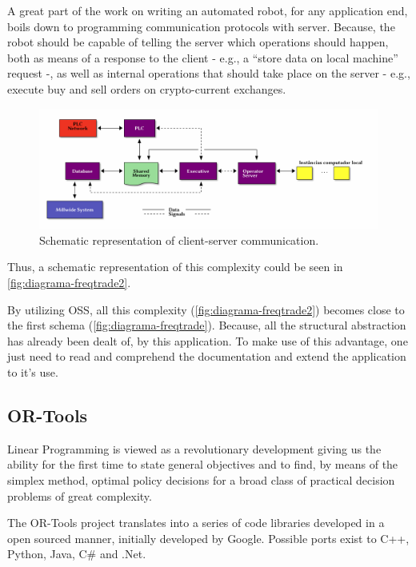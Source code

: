 \documentclass[
12pt,				%
openright,			%
oneside,			%
a4paper,			%
brazil,				%
english,			  %
]{abntex2}
\begin{document}
A great part of the work on writing an automated robot, for any
application end, boils down to programming communication protocols
with server. Because, the robot should be capable of telling the
server which operations should happen, both as means of a response to
the client - e.g., a ``store data on local machine'' request -, as
well as internal operations that should take place on the server -
e.g., execute buy and sell orders on crypto-current exchanges.  

\begin{figure}[ht]
  \centering
    \caption{\label{fig:diagrama-freqtrade2} Schematic representation
      of client-server communication.}
  \includegraphics[width=1\linewidth]{ditaa_4.png}
\end{figure}

Thus, a schematic representation of this complexity could be seen in \autoref{fig:diagrama-freqtrade2}.

By utilizing OSS, all this complexity
(\autoref{fig:diagrama-freqtrade2}) becomes close to the first schema
(\autoref{fig:diagrama-freqtrade}). Because, all the structural
abstraction has already been dealt of, by this application. To make
use of this advantage, one just need to read and comprehend the
documentation and extend the application to it's use.

\clearpage
\subsection{OR-Tools}
\label{sec:ortools}

\begin{citacao}
Linear Programming is viewed as a revolutionary development giving us
the ability for the first time to state general objectives and to
find, by means of the simplex method, optimal policy decisions for a
broad class of practical decision problems of great complexity. \cite{dantzig1983}
\end{citacao}


The OR-Tools project translates into a series of code libraries
developed in a open sourced manner, initially developed by
Google. Possible ports exist to C++, Python, Java, C\# and .Net.  
\end{document}
